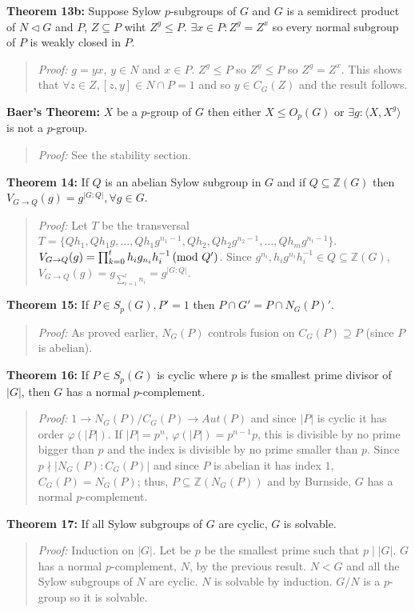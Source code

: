 {\bf Theorem 13b:} Suppose Sylow $p$-subgroups of $G$ and $G$ is a semidirect product of $N \lhd G$ and $P$,
$Z \subseteq P$ wiht $Z^g \leq P$. $\exists x \in P: Z^g = Z^x$ so every normal subgroup of $P$ is weakly
closed in $P$.
\begin{quote}
\emph{Proof:} 
$g=yx$, $y \in N$ and $x \in P$.
$Z^g \leq P$ so $Z^y \leq P$ so $Z^g = Z^x$.
This shows that $\forall z \in Z, [z,y] \in N \cap P = 1$ and so
$y \in C_G(Z)$ and the result follows.
\end{quote}
{\bf Baer's Theorem:}
$X$ be a $p$-group of $G$ then either
$X \le O_p(G)$ or $\exists g: \langle X, X^g \rangle $ is not a $p$-group.
\begin{quote}
\emph{Proof:}  
See the stability section.
\end{quote}
{\bf Theorem 14:} If $Q$ is an abelian Sylow subgroup in $G$ and if $Q \subseteq {\mathbb Z}(G)$ then
$V_{G \rightarrow Q}(g)= g^{|G:Q|}, \forall g \in G$.  
\begin{quote}
\emph{Proof:}  
Let $T$ be the transversal 
$T= \{ Qh_1, Qh_1g, \ldots , Qh_1g^{n_1-1}, Qh_2, Qh_2 g^{n_2-1}, \ldots, Qh_m g^{n_t-1} \}$. 
$V_{G \rightarrow Q}(g)= \prod_{k=0}^t h_i g_{n_i} h_i^{-1} \thinspace \textnormal{(mod } Q' \textnormal{)}$.  Since 
$g^{n_i}, h_i g^{n_i} h_i^{-1} \in Q \subseteq {\mathbb Z}(G)$, 
$V_{G \rightarrow Q}(g)= g_{\sum_{i=1}^t n_i} = g^{|G:Q|}$. 
\end{quote}
{\bf Theorem 15:}
If $P \in S_p (G), P'=1$ then $P \cap G' = P \cap N_G(P)'$.
\begin{quote}
\emph{Proof:}  
As proved earlier, $N_G(P)$ controls fusion on $C_G(P) \supseteq P$ (since $P$ is abelian).
\end{quote}
{\bf Theorem 16:} If $P \in S_p(G)$ is cyclic where $p$ is the smallest prime divisor of $|G|$,
then $G$ has a normal $p$-complement.
\begin{quote}
\emph{Proof:}  
$1 \rightarrow N_G(P)/C_G(P) \rightarrow Aut(P)$ and since $|P|$ is cyclic it has order
$\varphi(|P|)$.  If $|P|= p^n$, $\varphi(|P|)= p^{n-1}p$, this is divisible by no prime
bigger than $p$ and the index is divisible by no prime smaller than $p$.  
Since $p \nmid |N_G(P):C_G(P)|$ and since $P$ is abelian it has index $1$, $C_G(P)= N_G(P)$;
thus, $P \subseteq  {\mathbb Z}(N_G(P))$ and by Burnside, $G$ has a normal $p$-complement.
\end{quote}
{\bf Theorem 17:}
If all Sylow subgroups of $G$ are cyclic, $G$ is solvable.  
\begin{quote}
\emph{Proof:}  
Induction on $|G|$.  Let be $p$ be the smallest prime such that $p \mid |G|$.
$G$ has a normal $p$-complement, $N$, by the previous result.  $N < G$ and all the
Sylow subgroups of $N$ are cyclic.  $N$ is solvable by induction. $G/N$ is a $p$-group
so it is solvable.
\end{quote}
